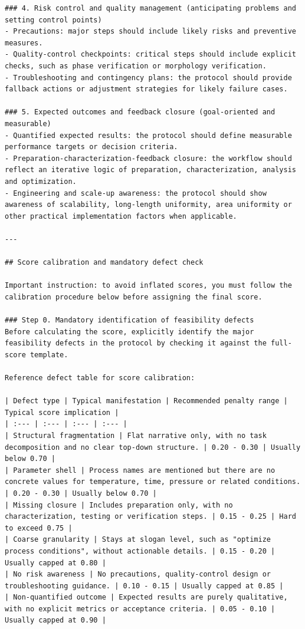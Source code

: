 \begin{lstlisting}[style=jsonstyle]
### 4. Risk control and quality management (anticipating problems and setting control points)
- Precautions: major steps should include likely risks and preventive measures.
- Quality-control checkpoints: critical steps should include explicit checks, such as phase verification or morphology verification.
- Troubleshooting and contingency plans: the protocol should provide fallback actions or adjustment strategies for likely failure cases.

### 5. Expected outcomes and feedback closure (goal-oriented and measurable)
- Quantified expected results: the protocol should define measurable performance targets or decision criteria.
- Preparation-characterization-feedback closure: the workflow should reflect an iterative logic of preparation, characterization, analysis and optimization.
- Engineering and scale-up awareness: the protocol should show awareness of scalability, long-length uniformity, area uniformity or other practical implementation factors when applicable.

---

## Score calibration and mandatory defect check

Important instruction: to avoid inflated scores, you must follow the calibration procedure below before assigning the final score.

### Step 0. Mandatory identification of feasibility defects
Before calculating the score, explicitly identify the major feasibility defects in the protocol by checking it against the full-score template.

Reference defect table for score calibration:

| Defect type | Typical manifestation | Recommended penalty range | Typical score implication |
| :--- | :--- | :--- | :--- |
| Structural fragmentation | Flat narrative only, with no task decomposition and no clear top-down structure. | 0.20 - 0.30 | Usually below 0.70 |
| Parameter shell | Process names are mentioned but there are no concrete values for temperature, time, pressure or related conditions. | 0.20 - 0.30 | Usually below 0.70 |
| Missing closure | Includes preparation only, with no characterization, testing or verification steps. | 0.15 - 0.25 | Hard to exceed 0.75 |
| Coarse granularity | Stays at slogan level, such as "optimize process conditions", without actionable details. | 0.15 - 0.20 | Usually capped at 0.80 |
| No risk awareness | No precautions, quality-control design or troubleshooting guidance. | 0.10 - 0.15 | Usually capped at 0.85 |
| Non-quantified outcome | Expected results are purely qualitative, with no explicit metrics or acceptance criteria. | 0.05 - 0.10 | Usually capped at 0.90 |


\end{lstlisting}
